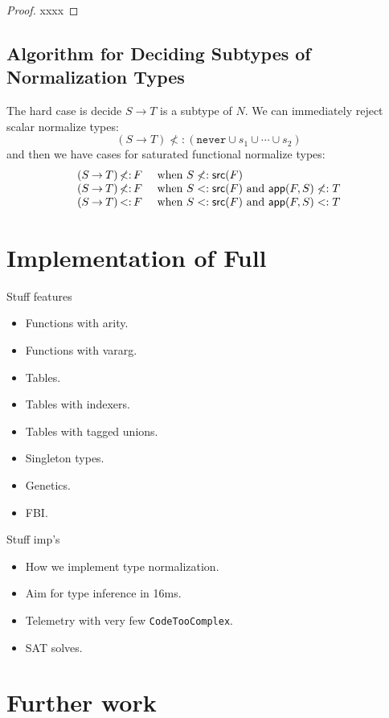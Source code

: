 \documentclass[acmsmall,review,screen]{acmart}
\newcommand{\NEVER}{\mathtt{never}}
\newcommand{\APP}{\mathsf{app}}
\newcommand{\SRC}{\mathsf{src}}
\newcommand{\fun}{\mathbin{\rightarrow}}
\begin{document}
\begin{proof}
  xxxx
\end{proof}

\subsection{Algorithm for Deciding Subtypes of Normalization Types}
\label{subsec:algth}

The hard case is decide $S \fun T$ is a subtype of $N$.
We can immediately reject scalar normalize types:
\[
  (S \fun T) \not<: (\NEVER \cup s_1 \cup\cdots\cup s_2)
\]
and then we have cases for saturated functional normalize types:
\[\begin{array}{r@{\,}c@{\,}ll}
  (S \fun T) & \not<: & F & \mbox{ when } S \not<: \SRC(F) \\
  (S \fun T) & \not<: & F & \mbox{ when } S <: \SRC(F) \mbox{ and } \APP(F, S) \not<: T \\
  (S \fun T) & <: & F & \mbox{ when } S <: \SRC(F) \mbox{ and } \APP(F, S) <: T
\end{array}\]


\section{Implementation of Full }

Stuff features
\begin{itemize}
\item Functions with arity.
\item Functions with vararg.
\item Tables.
\item Tables with indexers.
\item Tables with tagged unions.
\item Singleton types.
\item Genetics.
\item FBI.
\end{itemize}
Stuff imp's
\begin{itemize}
\item How we implement type normalization.
\item Aim for type inference in 16ms.
\item Telemetry with very few \verb|CodeTooComplex|.
\item SAT solves.
\end{itemize}

\section{Further work}
\end{document}
